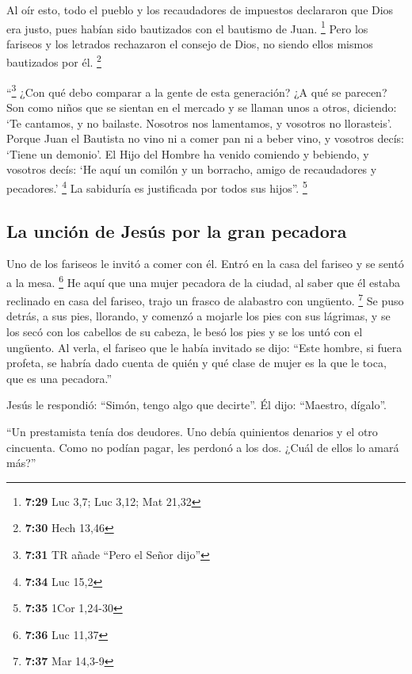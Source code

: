  Al oír esto, todo el pueblo y los recaudadores de
impuestos declararon que Dios era justo, pues habían sido bautizados con
el bautismo de Juan. \footnote{\textbf{7:29} Luc 3,7; Luc 3,12; Mat
  21,32}  Pero los fariseos y los letrados rechazaron el
consejo de Dios, no siendo ellos mismos bautizados por él. \footnote{\textbf{7:30}
  Hech 13,46}

 ``\footnote{\textbf{7:31} TR añade ``Pero el Señor
  dijo''} ¿Con qué debo comparar a la gente de esta generación? ¿A qué
se parecen?  Son como niños que se sientan en el mercado
y se llaman unos a otros, diciendo: `Te cantamos, y no bailaste.
Nosotros nos lamentamos, y vosotros no llorasteis'. 
Porque Juan el Bautista no vino ni a comer pan ni a beber vino, y
vosotros decís: `Tiene un demonio'.  El Hijo del Hombre
ha venido comiendo y bebiendo, y vosotros decís: `He aquí un comilón y
un borracho, amigo de recaudadores y pecadores.' \footnote{\textbf{7:34}
  Luc 15,2}  La sabiduría es justificada por todos sus
hijos''. \footnote{\textbf{7:35} 1Cor 1,24-30}

\hypertarget{la-unciuxf3n-de-jesuxfas-por-la-gran-pecadora}{%
\subsection{La unción de Jesús por la gran
pecadora}\label{la-unciuxf3n-de-jesuxfas-por-la-gran-pecadora}}

 Uno de los fariseos le invitó a comer con él. Entró en
la casa del fariseo y se sentó a la mesa. \footnote{\textbf{7:36} Luc
  11,37}  He aquí que una mujer pecadora de la ciudad, al
saber que él estaba reclinado en casa del fariseo, trajo un frasco de
alabastro con ungüento. \footnote{\textbf{7:37} Mar 14,3-9}
 Se puso detrás, a sus pies, llorando, y comenzó a
mojarle los pies con sus lágrimas, y se los secó con los cabellos de su
cabeza, le besó los pies y se los untó con el ungüento. 
Al verla, el fariseo que le había invitado se dijo: ``Este hombre, si
fuera profeta, se habría dado cuenta de quién y qué clase de mujer es la
que le toca, que es una pecadora.''

 Jesús le respondió: ``Simón, tengo algo que decirte''.
Él dijo: ``Maestro, dígalo''.

 ``Un prestamista tenía dos deudores. Uno debía
quinientos denarios y el otro cincuenta.  Como no podían
pagar, les perdonó a los dos. ¿Cuál de ellos lo amará más?''

